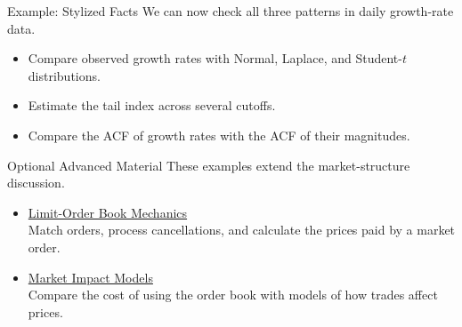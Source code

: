 \documentclass[aspectratio=169,11pt]{beamer}
\begin{document}
\begin{frame}{Example: Stylized Facts}
  We can now check all three patterns in daily growth-rate data.

  \vspace{0.7em}
  \begin{itemize}\setlength{\itemsep}{0.8em}
    \item Compare observed growth rates with Normal, Laplace, and Student-$t$
      distributions.
    \item Estimate the tail index across several cutoffs.
    \item Compare the ACF of growth rates with the ACF of their magnitudes.
  \end{itemize}

\end{frame}

\begin{frame}{Optional Advanced Material}
  These examples extend the market-structure discussion.

  \vspace{0.9em}
  \begin{itemize}\setlength{\itemsep}{1em}
    \item \href{https://github.com/varnerlab/CHEME-5660-CourseRepository-Fall-2026/blob/main/lectures/week-3/L3a/advanced/order_book/CHEME-5660-L3a-Advanced-LimitOrderBook-Mechanics-Fall-2026.ipynb}{Limit-Order Book Mechanics}\\
      Match orders, process cancellations, and calculate the prices paid
      by a market order.
    \item \href{https://github.com/varnerlab/CHEME-5660-CourseRepository-Fall-2026/blob/main/lectures/week-3/L3a/advanced/market_impact/CHEME-5660-L3a-Advanced-Market-Impact-Models-Fall-2026.ipynb}{Market Impact Models}\\
      Compare the cost of using the order book with models of how trades
      affect prices.
  \end{itemize}

\end{frame}
\end{document}
